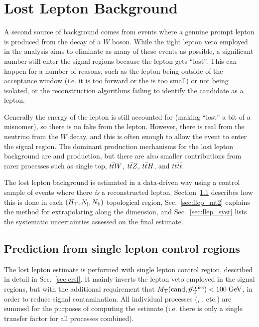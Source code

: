 \chapter{Lost Lepton Background}
\label{chap:lostlep}

A second source of background comes from events where a genuine prompt lepton is produced
from the decay of a $W$ boson. While the tight lepton veto employed in the analysis 
aims to eliminate as many of these events as possible, a significant number still enter
the signal regions because the lepton gets ``lost''. This can happen for a number
of reasons, such as the lepton being outside of the acceptance window (i.e. it is too forward
 or the \pt is too small) or not being isolated, or the reconstruction algorithms
failing to identify the candidate as a lepton. 

Generally the energy of the lepton is still
accounted for (making ``lost'' a bit of a misnomer), so there is no fake \ptmiss from the lepton. 
However, there is real \ptmiss from the neutrino from the $W$ decay, and this is often enough
to allow the event to enter the signal region. The dominant production mechanisms for the lost
lepton background are \wjets and \ttbar production, but there are also smaller contributions
from rarer processes such as single top, $t\bar{t} W$, $t\bar{t} Z$, $t\bar{t} H$, and $tt\bar{t}\bar{t}$.

The lost lepton background is estimated in a data-driven way using a control sample of events
where there \emph{is} a reconstructed lepton. Section~\ref{sec:llep_pred} describes how this
is done in each $(H_{\mathrm{T}}, N_{\mathrm{j}}, N_{\mathrm{b}})$ topological region, Sec.~\ref{sec:llep_mt2} explains the method
for extrapolating along the \mttwo dimension, and Sec.~\ref{sec:llep_syst} lists the systematic
uncertainties assessed on the final estimate.

\section{Prediction from single lepton control regions}
\label{sec:llep_pred}

The lost lepton estimate is performed with single lepton control region, described in detail 
in Sec.~\ref{sec:crsl}. It mainly inverts the  lepton veto employed in the signal regions,
but with the additional requirement that $M_{\mathrm{T}}(\mathrm{cand},\vec{p}_{\> \mathrm{T}}^{\> \mathrm{miss}})<100\;\text{Ge\hspace{-.08em}V}$, in order
to reduce signal contamination. All individual processes (\wjets, \ttbar, etc.) are summed
for the purposes of computing the estimate (i.e. there is only a single transfer factor for all
processes combined).

